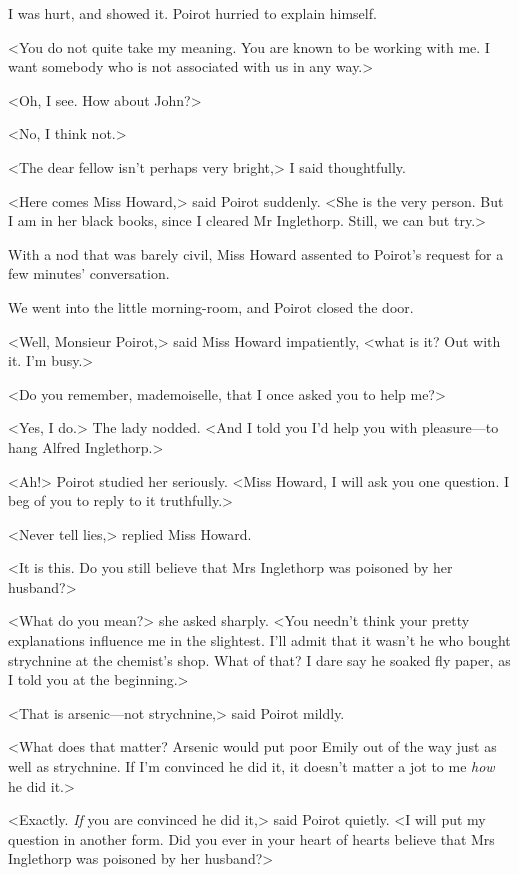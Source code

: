  I was hurt, and showed it. Poirot hurried to explain himself. 

 <You do not quite take my meaning. You are known to be working with me. I want somebody who is not associated with us in any way.> 

 <Oh, I see. How about John?> 

 <No, I think not.> 

 <The dear fellow isn't perhaps very bright,> I said thoughtfully. 

 <Here comes Miss Howard,> said Poirot suddenly. <She is the very person. But I am in her black books, since I cleared Mr Inglethorp. Still, we can but try.> 

 With a nod that was barely civil, Miss Howard assented to Poirot's request for a few minutes' conversation. 

 We went into the little morning-room, and Poirot closed the door. 

 <Well, Monsieur Poirot,> said Miss Howard impatiently, <what is it? Out with it. I'm busy.> 

 <Do you remember, mademoiselle, that I once asked you to help me?> 

 <Yes, I do.> The lady nodded. <And I told you I'd help you with pleasure—to hang Alfred Inglethorp.> 

 <Ah!> Poirot studied her seriously. <Miss Howard, I will ask you one question. I beg of you to reply to it truthfully.> 

 <Never tell lies,> replied Miss Howard. 

 <It is this. Do you still believe that Mrs Inglethorp was poisoned by her husband?> 

 <What do you mean?> she asked sharply. <You needn't think your pretty explanations influence me in the slightest. I'll admit that it wasn't he who bought strychnine at the chemist's shop. What of that? I dare say he soaked fly paper, as I told you at the beginning.> 

 <That is arsenic—not strychnine,> said Poirot mildly. 

 <What does that matter? Arsenic would put poor Emily out of the way just as well as strychnine. If I'm convinced he did it, it doesn't matter a jot to me \emph{how} he did it.> 

 <Exactly. \emph{If} you are convinced he did it,> said Poirot quietly. <I will put my question in another form. Did you ever in your heart of hearts believe that Mrs Inglethorp was poisoned by her husband?> 

